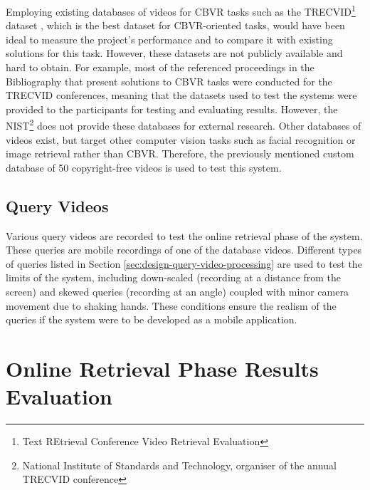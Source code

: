 Employing existing databases of videos for CBVR tasks such as the TRECVID\footnote{Text REtrieval Conference Video Retrieval Evaluation} dataset \cite{2018trecvidawad}, which is the best dataset for CBVR-oriented tasks, would have been ideal to measure the project's performance and to compare it with existing solutions for this task. However, these datasets are not publicly available and hard to obtain. For example, most of the referenced proceedings in the Bibliography that present solutions to CBVR tasks were conducted for the TRECVID conferences, meaning that the datasets used to test the systems were provided to the participants for testing and evaluating results. However, the NIST\footnote{National Institute of Standards and Technology, organiser of the annual TRECVID conference} does not provide these databases for external research. Other databases of videos exist, but target other computer vision tasks such as facial recognition or image retrieval rather than CBVR. Therefore, the previously mentioned custom database of 50 copyright-free videos is used to test this system.


\subsection{Query Videos}

Various query videos are recorded to test the online retrieval phase of the system. These queries are mobile recordings of one of the database videos. Different types of queries listed in Section \ref{sec:design-query-video-processing} are used to test the limits of the system, including down-scaled (recording at a distance from the screen) and skewed queries (recording at an angle) coupled with minor camera movement due to shaking hands. These conditions ensure the realism of the queries if the system were to be developed as a mobile application.


\section{Online Retrieval Phase Results Evaluation}

